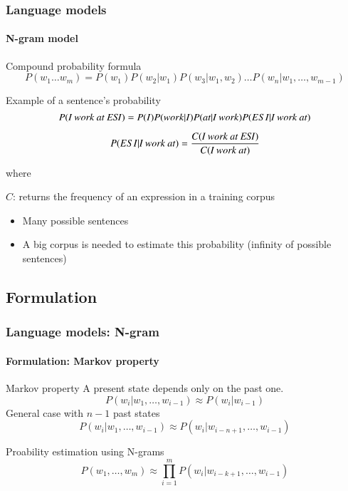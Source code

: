 \documentclass[xcolor=table]{beamer}
\begin{document}
\begin{frame}
\frametitle{Language models}
\framesubtitle{N-gram model}

\vspace{-6pt}
\begin{block}{Compound probability formula}
	\[ P(w_1 \ldots w_m) =  P(w_1) P(w_2 | w_1) P(w_3 | w_1, w_2) \ldots P(w_n | w_1, \ldots, w_{m-1}) \]
\end{block}

\vspace{-6pt}
\begin{exampleblock}{Example of a sentence's probability}
	\[ P(\text{\textit{I work at ESI}}) =  P(I) P(work | I) P(\text{\textit{at}} | \text{\textit{I work}}) P(ESI | \text{\textit{I work at}}) \]
	
	\vspace{-3pt}\[ P(ESI | \text{\textit{I work at}}) = \frac{C(\text{\textit{I work at ESI}})}{C( \text{\textit{I work at}})} \] 
	
	where 
	
	$C$: returns the frequency of an expression in a training corpus
\end{exampleblock}

\begin{itemize}
	\item Many possible sentences
	\item A big corpus is needed to estimate this probability (infinity of possible sentences)
\end{itemize}

\end{frame}

\subsection{Formulation}

\begin{frame}
\frametitle{Language models: N-gram}
\framesubtitle{Formulation: Markov property}

\begin{block}{Markov property}
	A present state depends only on the past one. 
	\[%
	P(w_i | w_1,\ldots, w_{i-1}) \approx P(w_i | w_{i-1})
	\]
	General case with $n-1$ past states
	\[%
	P(w_i | w_1,\ldots, w_{i-1}) \approx P(w_i | w_{i-n+1}, \ldots, w_{i-1})
	\]
\end{block}

\begin{block}{Proability estimation using N-grams}
	\[
	P(w_1,\ldots, w_{m}) \approx \prod_{i=1}^m P(w_i | w_{i-k+1}, \ldots, w_{i-1})
	\]
\end{block}

\end{frame}
\end{document}
